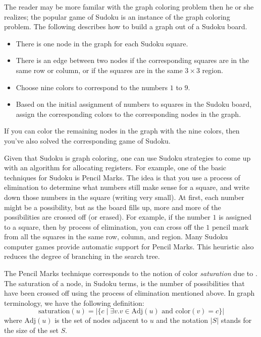 \documentclass[12pt]{book}
\begin{document}
The reader may be more familar with the graph coloring problem then he
or she realizes; the popular game of Sudoku is an instance of the
graph coloring problem. The following describes how to build a graph
out of a Sudoku board.
\begin{itemize}
\item There is one node in the graph for each Sudoku square.
\item There is an edge between two nodes if the corresponding squares
  are in the same row or column, or if the squares are in the same
  $3\times 3$ region.
\item Choose nine colors to correspond to the numbers $1$ to $9$.
\item Based on the initial assignment of numbers to squares in the
  Sudoku board, assign the corresponding colors to the corresponding
  nodes in the graph.
\end{itemize}
If you can color the remaining nodes in the graph with the nine
colors, then you've also solved the corresponding game of Sudoku.

Given that Sudoku is graph coloring, one can use Sudoku strategies to
come up with an algorithm for allocating registers. For example, one
of the basic techniques for Sudoku is Pencil Marks. The idea is that
you use a process of elimination to determine what numbers still make
sense for a square, and write down those numbers in the square
(writing very small). At first, each number might be a
possibility, but as the board fills up, more and more of the
possibilities are crossed off (or erased). For example, if the number
$1$ is assigned to a square, then by process of elimination, you can
cross off the $1$ pencil mark from all the squares in the same row,
column, and region. Many Sudoku computer games provide automatic
support for Pencil Marks. This heuristic also reduces the degree of
branching in the search tree.

The Pencil Marks technique corresponds to the notion of color
\emph{saturation} due to \cite{Brelaz:1979eu}.  The
saturation of a node, in Sudoku terms, is the number of possibilities
that have been crossed off using the process of elimination mentioned
above. In graph terminology, we have the following definition:
\begin{equation*}
  \mathrm{saturation}(u) = |\{ c \;|\; \exists v. v \in \mathrm{Adj}(u) 
     \text{ and } \mathrm{color}(v) = c \}|
\end{equation*}
where $\mathrm{Adj}(u)$ is the set of nodes adjacent to $u$ and
the notation $|S|$ stands for the size of the set $S$.
\end{document}
